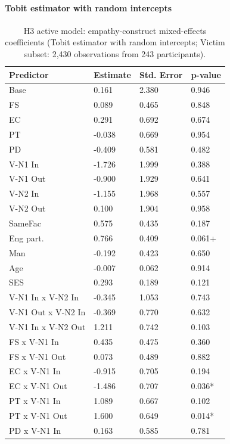 \documentclass[11pt]{article}
\begin{document}
\paragraph{Tobit estimator with random intercepts}

\begin{table}[H]
\centering
{\fontsize{11}{13}\selectfont
\renewcommand{\arraystretch}{1.10}
\caption{H3 active model: empathy-construct mixed-effects coefficients (Tobit estimator with random intercepts; Victim subset: 2,430 observations from 243 participants).}
\label{tab:h3_b_victim}
\begin{tabularx}{\textwidth}{>{\raggedright\arraybackslash}Xlll}
\toprule
Predictor & Estimate & Std. Error & p-value \\
\midrule
Base & 0.161 & 2.380 & 0.946 \\
FS & 0.089 & 0.465 & 0.848 \\
EC & 0.291 & 0.692 & 0.674 \\
PT & -0.038 & 0.669 & 0.954 \\
PD & -0.409 & 0.581 & 0.482 \\
V-N1 In & -1.726 & 1.999 & 0.388 \\
V-N1 Out & -0.900 & 1.929 & 0.641 \\
V-N2 In & -1.155 & 1.968 & 0.557 \\
V-N2 Out & 0.100 & 1.904 & 0.958 \\
SameFac & 0.575 & 0.435 & 0.187 \\
Eng part. & 0.766 & 0.409 & 0.061+ \\
Man & -0.192 & 0.423 & 0.650 \\
Age & -0.007 & 0.062 & 0.914 \\
SES & 0.293 & 0.189 & 0.121 \\
V-N1 In x V-N2 In & -0.345 & 1.053 & 0.743 \\
V-N1 Out x V-N2 In & -0.369 & 0.770 & 0.632 \\
V-N1 In x V-N2 Out & 1.211 & 0.742 & 0.103 \\
FS x V-N1 In & 0.435 & 0.475 & 0.360 \\
FS x V-N1 Out & 0.073 & 0.489 & 0.882 \\
EC x V-N1 In & -0.915 & 0.705 & 0.194 \\
EC x V-N1 Out & -1.486 & 0.707 & 0.036* \\
PT x V-N1 In & 1.089 & 0.667 & 0.102 \\
PT x V-N1 Out & 1.600 & 0.649 & 0.014* \\
PD x V-N1 In & 0.163 & 0.585 & 0.781 \\

\end{tabularx}}
\end{table}
\end{document}
